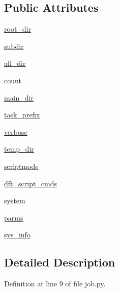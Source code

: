 \subsection*{Public Attributes}
\begin{DoxyCompactItemize}
\item 
\hyperlink{class_d_f_t___k_i_t_1_1core_1_1job_1_1job_abb15d70a73681fdcb58f47f8e50dfd27}{root\+\_\+dir}
\item 
\hyperlink{class_d_f_t___k_i_t_1_1core_1_1job_1_1job_ac7c9c09824d5c150b099515aff786133}{subdir}
\item 
\hyperlink{class_d_f_t___k_i_t_1_1core_1_1job_1_1job_a82e6d74a67efb940b6a1e3664fc091ce}{all\+\_\+dir}
\item 
\hyperlink{class_d_f_t___k_i_t_1_1core_1_1job_1_1job_a8d327d68b516e10dbbe4e5894d575f6c}{count}
\item 
\hyperlink{class_d_f_t___k_i_t_1_1core_1_1job_1_1job_a9f6d722a77d028d1445a63e32aa4cb64}{main\+\_\+dir}
\item 
\hyperlink{class_d_f_t___k_i_t_1_1core_1_1job_1_1job_a077129193f3591250f3a34cf8de82ece}{task\+\_\+prefix}
\item 
\hyperlink{class_d_f_t___k_i_t_1_1core_1_1job_1_1job_a9dd538e066c27fca43c2f32277ff1a14}{verbose}
\item 
\hyperlink{class_d_f_t___k_i_t_1_1core_1_1job_1_1job_abfa19936f85b2fa86d6ec3b8e54c43f9}{temp\+\_\+dir}
\item 
\hyperlink{class_d_f_t___k_i_t_1_1core_1_1job_1_1job_adab9e4d01f4efc42cff4c8db7571c9d0}{scriptmode}
\item 
\hyperlink{class_d_f_t___k_i_t_1_1core_1_1job_1_1job_a29076a837f2b24097b2334d04548bed1}{dft\+\_\+script\+\_\+cmds}
\item 
\hyperlink{class_d_f_t___k_i_t_1_1core_1_1job_1_1job_a0f24589a9b46619f6b1aa898232b2fe1}{system}
\item 
\hyperlink{class_d_f_t___k_i_t_1_1core_1_1job_1_1job_ae3cbf83ff79394348272359583f44a76}{parms}
\item 
\hyperlink{class_d_f_t___k_i_t_1_1core_1_1job_1_1job_a7d937c671c8469b64be7d4b29ed0e7b8}{sys\+\_\+info}
\end{DoxyCompactItemize}


\subsection{Detailed Description}


Definition at line 9 of file job.\+py.




